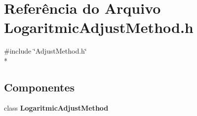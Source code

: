 \section{Referência do Arquivo Logaritmic\+Adjust\+Method.\+h}
\label{_logaritmic_adjust_method_8h}
{\ttfamily \#include \char`\"{}Adjust\+Method.\+h\char`\"{}}\\*
\subsection*{Componentes}
\begin{DoxyCompactItemize}
\item 
class {\bf Logaritmic\+Adjust\+Method}
\end{DoxyCompactItemize}
